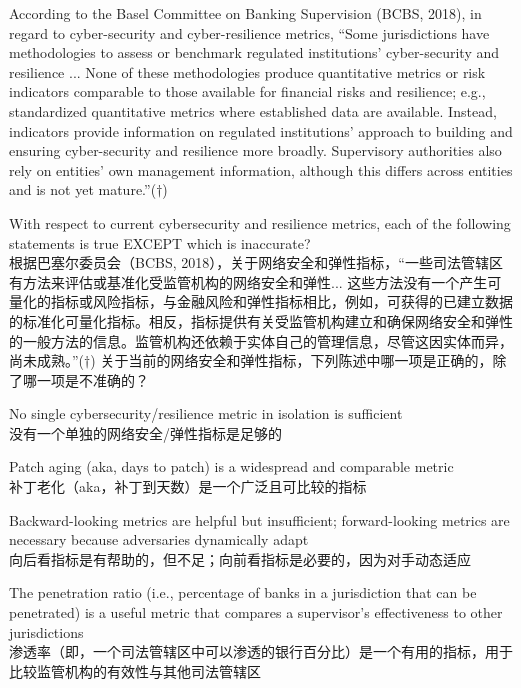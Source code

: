 \documentclass{article}
\newcounter{question} %
\begin{document}
  \begin{question}
      According to the Basel Committee on Banking Supervision (BCBS, 2018), in regard to cyber-security and cyber-resilience metrics, “Some jurisdictions have methodologies to assess or benchmark regulated institutions’ cyber-security and resilience ... None of these methodologies produce quantitative metrics or risk indicators comparable to those available for financial risks and resilience; e.g., standardized quantitative metrics where established data are available. Instead, indicators provide information on regulated institutions’ approach to building and ensuring cyber-security and resilience more broadly. Supervisory authorities also rely on entities’ own management information, although this differs across entities and is not yet mature.”($\dagger$)
  
      With respect to current cybersecurity and resilience metrics, each of the following statements is true EXCEPT which is inaccurate?\\
      根据巴塞尔委员会（BCBS, 2018），关于网络安全和弹性指标，“一些司法管辖区有方法来评估或基准化受监管机构的网络安全和弹性... 这些方法没有一个产生可量化的指标或风险指标，与金融风险和弹性指标相比，例如，可获得的已建立数据的标准化可量化指标。相反，指标提供有关受监管机构建立和确保网络安全和弹性的一般方法的信息。监管机构还依赖于实体自己的管理信息，尽管这因实体而异，尚未成熟。”($\dagger$)
      关于当前的网络安全和弹性指标，下列陈述中哪一项是正确的，除了哪一项是不准确的？
  \end{question}
  
  \begin{choices}
      \item No single cybersecurity/resilience metric in isolation is sufficient\\
      没有一个单独的网络安全/弹性指标是足够的
      \item Patch aging (aka, days to patch) is a widespread and comparable metric\\
      补丁老化（aka，补丁到天数）是一个广泛且可比较的指标
      \item Backward-looking metrics are helpful but insufficient; forward-looking metrics are necessary because adversaries dynamically adapt\\
      向后看指标是有帮助的，但不足；向前看指标是必要的，因为对手动态适应
      \item The penetration ratio (i.e., percentage of banks in a jurisdiction that can be penetrated) is a useful metric that compares a supervisor's effectiveness to other jurisdictions\\
      渗透率（即，一个司法管辖区中可以渗透的银行百分比）是一个有用的指标，用于比较监管机构的有效性与其他司法管辖区
  \end{choices}
  
\end{document}
